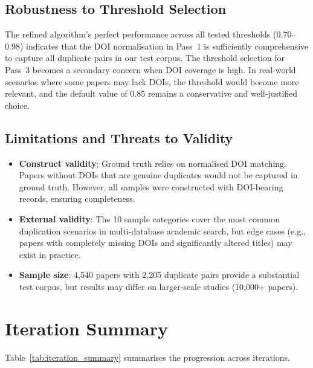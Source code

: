 \documentclass[conference]{IEEEtran}
\begin{document}
\subsection{Robustness to Threshold Selection}

The refined algorithm's perfect performance across all tested thresholds (0.70--0.98) indicates that the DOI normalisation in Pass~1 is sufficiently comprehensive to capture all duplicate pairs in our test corpus. The threshold selection for Pass~3 becomes a secondary concern when DOI coverage is high. In real-world scenarios where some papers may lack DOIs, the threshold would become more relevant, and the default value of 0.85 remains a conservative and well-justified choice.

\subsection{Limitations and Threats to Validity}

\begin{itemize}
    \item \textbf{Construct validity}: Ground truth relies on normalised DOI matching. Papers without DOIs that are genuine duplicates would not be captured in ground truth. However, all samples were constructed with DOI-bearing records, ensuring completeness.
    \item \textbf{External validity}: The 10 sample categories cover the most common duplication scenarios in multi-database academic search, but edge cases (e.g., papers with completely missing DOIs and significantly altered titles) may exist in practice.
    \item \textbf{Sample size}: 4{,}540 papers with 2{,}205 duplicate pairs provide a substantial test corpus, but results may differ on larger-scale studies (10{,}000+ papers).
\end{itemize}

\section{Iteration Summary}

Table~\ref{tab:iteration_summary} summarises the progression across iterations.
\end{document}
